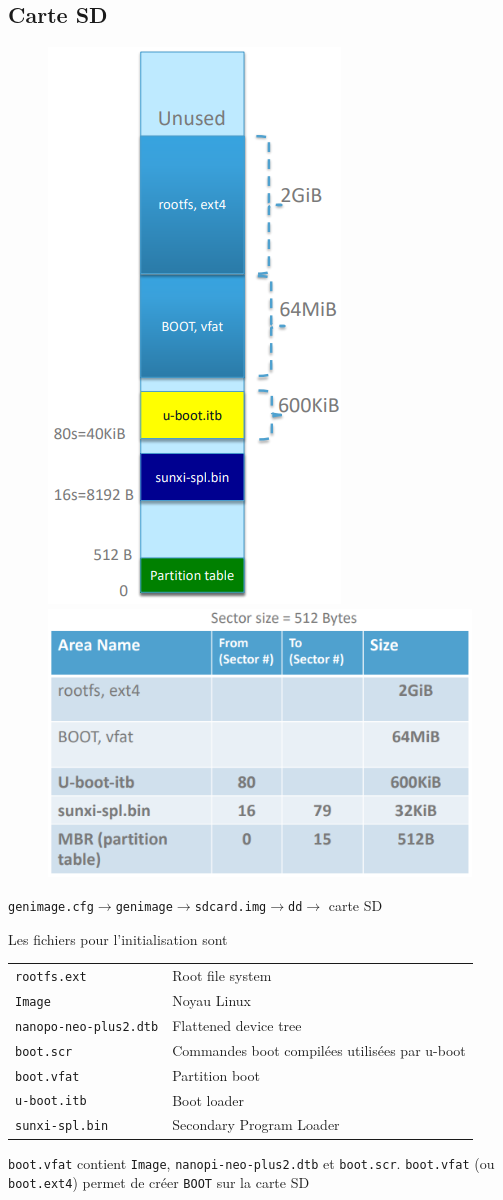 \documentclass[resume]{subfiles}
\begin{document}
\subsection{Carte SD}
\begin{figure}[H]
\centering
\includegraphics[height=\columnwidth,angle=90]{img_2.png}\\
\includegraphics[width=0.5\columnwidth]{img_3.png}
\end{figure}
\begin{center}
\verb!genimage.cfg!$\longrightarrow$\verb!genimage!$\longrightarrow$\verb!sdcard.img!$\longrightarrow$\verb!dd!$\longrightarrow$ carte SD
\end{center}
Les fichiers pour l'initialisation sont\\
\begin{table}[H]
\begin{tabular}{ll}
\verb!rootfs.ext! & Root file system\\
\verb!Image! & Noyau Linux\\
\verb!nanopo-neo-plus2.dtb! & Flattened device tree\\
\verb!boot.scr! & Commandes boot compilées utilisées par u-boot\\
\verb!boot.vfat! & Partition boot\\
\verb!u-boot.itb! & Boot loader\\
\verb!sunxi-spl.bin! & Secondary Program Loader
\end{tabular}
\end{table}
\verb!boot.vfat! contient \verb!Image!, \verb!nanopi-neo-plus2.dtb! et \verb!boot.scr!. \verb!boot.vfat! (ou \verb!boot.ext4!) permet de créer \verb!BOOT! sur la carte SD
\end{document}

